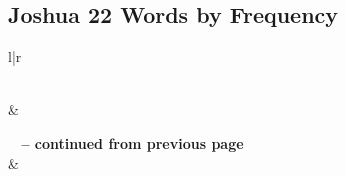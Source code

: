 

\subsection{Joshua 22 Words by Frequency}


\normalsize
 
\begin{center}
\begin{longtable}{l|r}
\caption[Joshua 22 Words by Frequency]{Joshua 22 Words by Frequency}\label{table:WordsbyFrequency for Joshua 22} \\
\hline {} &  \\ \hline 
\endfirsthead
 
{{\bfseries \tablename\ \thetable{} -- continued from previous page}} \\  
\hline {} &  \\ \hline 
\endhead
 

\end{longtable}
\end{center}
